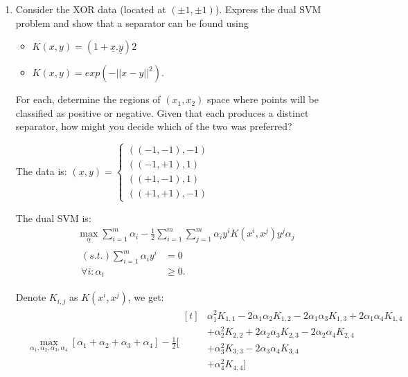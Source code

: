 \documentclass[letter, 12pt]{article}
\begin{document}
\begin{enumerate}
    	\item{Consider the XOR data (located at $ (\pm1, \pm1) $). Express the dual SVM problem and show that a separator can be found using
    		\begin{itemize}
    			\item{$ K(x, y) = (1 + \underline{x}.\underline{y}) 2 $}
    			\item{$ K(x, y) = exp(-||x - y||^2 ). $}
    		\end{itemize}
    		For each, determine the regions of $ (x_1 , x_2 ) $ space where points will be classified as positive or negative. Given
    		that each produces a distinct separator, how might you decide which of the two was preferred?
    	}
    	\par{The data is:}
    	$ (\underline{x}, y) = 
    	\begin{cases}
    	((-1, -1), -1) \\
    	((-1, +1), 1) \\
    	((+1, -1), 1) \\
    	((+1, +1), -1)
    	\end{cases} $
    	\par{The dual SVM is:}
    	\begin{align*}
    		&\max_{\underline{\alpha}} \sum_{i=1}^{m} \alpha_i - \frac{1}{2} \sum_{i=1}^{m} \sum_{j=1}^{m} \alpha_i y^i K(x^i, x^j) y^j \alpha_j \\
    		&
    		\begin{aligned}
	    		(s.t.) \sum_{i=1}^{m} \alpha_i y^i &= 0 \\
	    		\forall i: \alpha_i &\ge 0.
    		\end{aligned}
    	\end{align*}
    	\par{Denote $ K_{i, j} $ as $ K(x^i, x^j) $, we get:}
    	\begin{align*}
    	&\max_{\alpha_1, \alpha_2, \alpha_3, \alpha_4} [\alpha_1 + \alpha_2 + \alpha_3 + \alpha_4] - \frac{1}{2} [
    	\begin{aligned}[t]
    	&\alpha_1^2 K_{1,1} - 2\alpha_1 \alpha_2 K_{1,2} - 2\alpha_1 \alpha_3 K_{1,3} + 2\alpha_1 \alpha_4 K_{1,4} \\
    	& + \alpha_2^2 K_{2,2} + 2\alpha_2 \alpha_3 K_{2,3} - 2\alpha_2 \alpha_4 K_{2,4} \\
    	& + \alpha_3^2 K_{3,3} - 2\alpha_3 \alpha_4 K_{3,4} \\
    	& + \alpha_4^2 K_{4,4} ] \\
    	\end{aligned} \\

\end{align*}
\end{enumerate}
\end{document}
